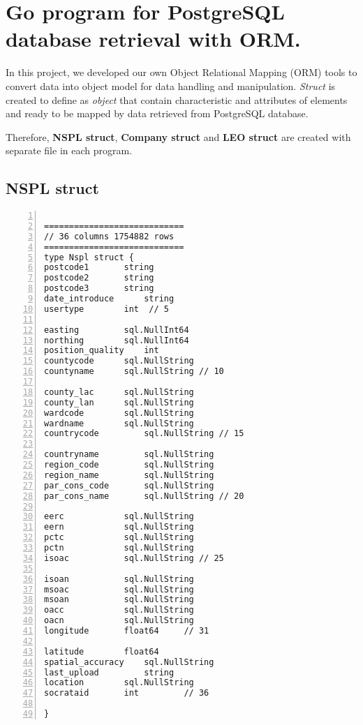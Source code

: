 \newpage

\section{Go program for PostgreSQL database retrieval with ORM.}

In this project, we developed our own Object Relational Mapping (ORM) tools to convert data into object model for data handling and manipulation. \textit{Struct} is created to define as \textit{object} that contain characteristic and attributes of elements and ready to be mapped by data retrieved from PostgreSQL database. 

Therefore, \textbf{NSPL struct}, \textbf{Company struct} and \textbf{LEO struct} are created with separate file in each program. 

\subsection{NSPL struct}
\lstset{basicstyle=\ttfamily\tiny}  
\begin{lstlisting}[breaklines, frame=single, numbers=left, caption={Source code for NSPL struct. (nspl.go)}, label=commandline-02]

============================
// 36 columns 1754882 rows 
============================
type Nspl struct {
postcode1 		string 
postcode2 		string 
postcode3 		string 
date_introduce 		string 
usertype 		int  // 5

easting 		sql.NullInt64
northing 		sql.NullInt64
position_quality 	int 
countycode 		sql.NullString 
countyname 		sql.NullString // 10

county_lac 		sql.NullString 
county_lan 		sql.NullString 
wardcode 		sql.NullString 
wardname 		sql.NullString 
countrycode 		sql.NullString // 15

countryname 		sql.NullString 
region_code 		sql.NullString 
region_name 		sql.NullString 
par_cons_code 		sql.NullString 
par_cons_name 		sql.NullString // 20

eerc 			sql.NullString 
eern 			sql.NullString 
pctc 			sql.NullString 
pctn 			sql.NullString 
isoac 			sql.NullString // 25 

isoan 			sql.NullString 
msoac 			sql.NullString 
msoan 			sql.NullString 
oacc 			sql.NullString 	
oacn 			sql.NullString 
longitude 		float64 	// 31

latitude 		float64 
spatial_accuracy 	sql.NullString 
last_upload 		string 
location 		sql.NullString 
socrataid 		int  		// 36

}

\end{lstlisting}

